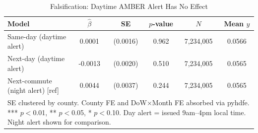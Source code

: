 \begin{table}[htbp]\centering
\caption{Falsification: Daytime AMBER Alert Has No Effect}
\begin{tabular}{lccccc}
\hline\hline
Model & $\hat\beta$ & SE & $p$-value & $N$ & Mean $y$ \\
\midrule
Same-day (daytime alert) & 0.0001 & (0.0016) & 0.962 & 7,234,005 & 0.0566 \\
Next-day (daytime alert) & -0.0013 & (0.0020) & 0.510 & 7,234,005 & 0.0565 \\
Next-commute (night alert) [ref] & 0.0044 & (0.0037) & 0.244 & 7,234,005 & 0.0565 \\
\hline\hline
\multicolumn{6}{p{0.9\textwidth}}{\footnotesize SE clustered by county. County FE and DoW$\times$Month FE absorbed via pyhdfe. *** $p{<}$0.01, ** $p{<}$0.05, * $p{<}$0.10. Day alert = issued 9am--4pm local time. Night alert shown for comparison.} \\
\end{tabular}
\end{table}